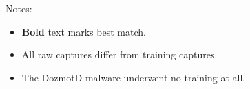 \documentclass[13pt,journal,compsoc,onecolumn]{IEEEtran}
\begin{document}
\begin{table}[!ht]
Notes:
\begin{itemize}
\item \textbf{Bold} text marks best match.
\item All raw captures differ from training captures.
\item The DozmotD malware underwent no training at all.
\end{itemize}
\end{table}


%
%



%
%
\end{document}
